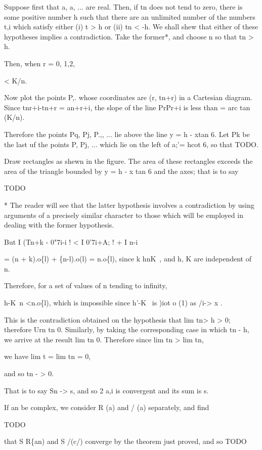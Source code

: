 Suppose first that a, a, ... are real. Then, if tn does not tend
to zero, there is some positive number h such that there are an
unlimited number of the numbers t,i which satisfy either (i) t > h
or (ii) tn < -h. We shall shew that either of these hypotheses implies
a contradiction. Take the former*, and choose n so that tn > h.

Then, when r = 0, 1,2,

< K/n.

Now plot the points P,. whose coordinates are (r, tn+r) in a Cartesian
diagram. Since tnr+i-tn+r = an+r+i, the slope of the line PrPr+i is
less than = arc tan (K/n).

Therefore the points Pq, Pj, P.,, ... lie above the line y = h - xtan
6. Let Pk be the last uf the points P, Pj, ... which lie on the left
of a;'= hcot 6, so that TODO.

Draw rectangles as shewn in the figure. The area of these rectangles
exceeds the area of the triangle bounded by y = h - x tan 6 and the
axes; that is to say

TODO

* The reader will see that the latter hypothesis involves a
contradiction by using arguments of a precisely similar character to
those which will be employed in dealing with the former hypothesis.

%
%

But I (Tn+k - 0"7i-i ! < I 0'7i+A; ! + I n-i \

= (n + k).o\{l) + \{n-l).o(l) = n.o\{l), since k  hnK~, and h, K
are independent of n.

Therefore, for a set of values of n tending to infinity,

h-K~n <n.o\{l), which is impossible since h'-K~ is )iot o (1)
as /i-> x .

This is the contradiction obtained on the hypothesis that lim tn> h >
0; therefore Urn tn  0. Similarly, by taking the corresponding case
in which tn - h, we arrive at the result lim tn  0. Therefore
since lim tn > lim tn,

we have lim t = lim tn = 0,

and so tn - > 0.

That is to say Sn -> s, and so 2 a,i is convergent and its sum is s.

If an be complex, we consider R (a) and / (a) separately, and find

TODO

that S R\{an) and S /(c/) converge by the theorem just proved, and so
TODO

